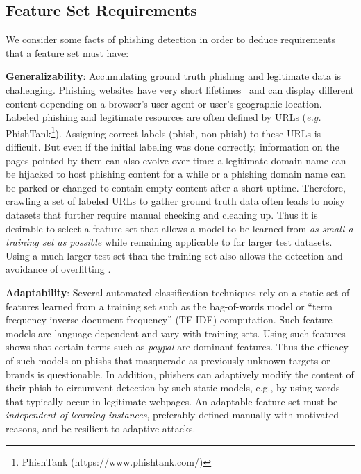 \documentclass[10pt,conference,compsocconf,letterpaper]{IEEEtran}
\begin{document}
\subsection{Feature Set Requirements}
\label{subsec:requirements}

We consider some facts of phishing detection in order to deduce requirements that a feature set must have:

\noindent\textbf{Generalizability}: Accumulating ground truth phishing and legitimate data is challenging. Phishing websites have very short lifetimes~\cite{apwg:2015} and can display different content depending on a browser's user-agent or user's geographic location. Labeled phishing and legitimate resources are often defined by URLs (\textit{e.g.} PhishTank\footnote{PhishTank (https://www.phishtank.com/)}). Assigning correct labels (phish, non-phish) to these URLs is difficult. But even if the initial labeling was done correctly, information on the pages pointed by them can also evolve over time: a legitimate domain name can be hijacked to host phishing content for a while or a phishing domain name can be parked or changed to contain empty content after a short uptime. Therefore, crawling a set of labeled URLs to gather ground truth data often leads to noisy datasets that further require manual checking and cleaning up.
Thus it is desirable to select a feature set that allows a model to be learned from \emph{as small a training set as possible} while remaining applicable to far larger test datasets. 
Using a much larger test set than the training set also allows the detection and avoidance of overfitting \cite{Dietterich:1995:overfitting}.  

\noindent\textbf{Adaptability}: Several automated classification techniques \cite{thomas:2011:design,whittaker:2010:large,zhang:2007:cantina} rely on a static set of features learned from a training set such as the bag-of-words model or ``term frequency-inverse document frequency'' (TF-IDF) \cite{Salton:1983:introduction} computation. Such feature models are language-dependent and vary with training sets. Using such features shows \cite{whittaker:2010:large} that certain terms such as \textit{paypal} are dominant features. Thus the efficacy of such models on phishs that masquerade as previously unknown targets or brands is questionable. 
In addition, phishers can adaptively modify the content of their phish to circumvent detection by such static models, e.g.,  by using words that typically occur in legitimate webpages.
An adaptable feature set must be \emph{independent of learning instances}, preferably defined manually with motivated reasons, and be resilient to adaptive attacks.
\end{document}

